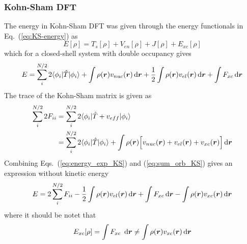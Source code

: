 \subsubsection{Kohn-Sham DFT}
The energy in Kohn-Sham DFT was given through the energy functionals in Eq.~(\ref{eq:KS-energy}) as
\begin{equation}
    E[\rho] = T_s[\rho] + V_{en}[\rho] + J[\rho] + E_{xc}[\rho]
\end{equation}
which for a closed-shell system with double occupancy gives
\begin{equation}
    \label{eq:energy_exp_KS}
    E = \sum_i^{N/2} 2\langle \phi_i|\hat{T}|\phi_i \rangle
	+ \int \rho(\boldsymbol r)v_{nuc}(\boldsymbol r) \,\mathrm{d}\boldsymbol r
	+ \frac{1}{2} \int \rho(\boldsymbol r)v_{el}(\boldsymbol r) \,\mathrm{d}\boldsymbol r
	+ \int F_{xc} \,\mathrm{d}\boldsymbol r
\end{equation}
The trace of the Kohn-Sham matrix is given as
\begin{align}
    \sum_i^{N/2} 2F_{ii} &= \sum_i^{N/2} 2\langle\phi_i|\hat{T} + v_{eff}|\phi_i\rangle\\
    \label{eq:sum_orb_KS}
		    &= \sum_i^{N/2} 2\langle\phi_i|\hat{T}|\phi_i\rangle
		     + \int \rho(\boldsymbol r)\Big[v_{nuc}(\boldsymbol r) + v_{el}(\boldsymbol r) + v_{xc}(\boldsymbol r)\Big] \,\mathrm{d}\boldsymbol r
\end{align}
Combining Eqs.~(\ref{eq:energy_exp_KS}) and (\ref{eq:sum_orb_KS}) gives an expression without
kinetic energy
\begin{equation}
    E = 2 \sum_i^{N/2} F_{ii} - \frac{1}{2} \int \rho(\boldsymbol r)v_{el}(\boldsymbol r) \,\mathrm{d}\boldsymbol r
	+ \int F_{xc} \,\mathrm{d}\boldsymbol r - \int \rho(\boldsymbol r)v_{xc}(\boldsymbol r) \,\mathrm{d}\boldsymbol r
\end{equation}
where it should be notet that 
\begin{equation}
    E_{xc}[\rho] = \int F_{xc} \ud\bs{r} \neq \int \rho(\bs{r})v_{xc}(\bs{r}) \ud\bs{r}
\end{equation}

